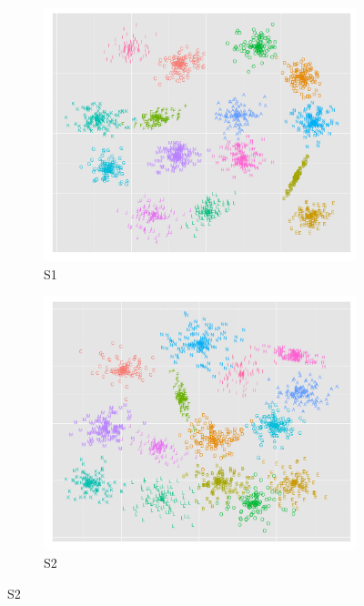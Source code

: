 \begin{figure}[H]
\centering
\begin{subfigure}{.4\textwidth}
  \centering
  \includegraphics[width=.8\linewidth]{s_set/s_set_1_truth.png}
  \caption{S1}
\end{subfigure}%
\begin{subfigure}{.4\textwidth}
  \centering
  \includegraphics[width=.8\linewidth]{s_set/s_set_2_truth.png}
  \caption{S2}
\end{subfigure}


\end{figure}
